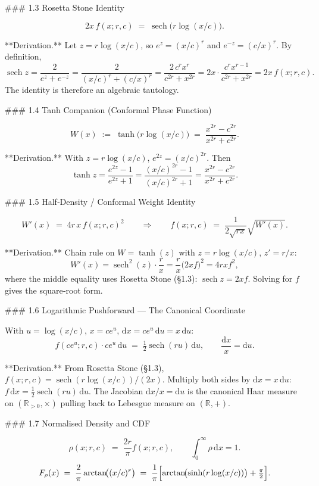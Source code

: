### 1.3 Rosetta Stone Identity

$$
\boxed{\;2x\,f(x;r,c)\;=\;\operatorname{sech}\!\bigl(r\log(x/c)\bigr).\;}
$$

**Derivation.** Let $z=r\log(x/c)$, so $e^{z}=(x/c)^{r}$ and $e^{-z}=(c/x)^{r}$. By definition,
$$
\operatorname{sech} z = \frac{2}{e^{z}+e^{-z}} = \frac{2}{(x/c)^{r}+(c/x)^{r}} = \frac{2\,c^{r}x^{r}}{c^{2r}+x^{2r}} = 2x\cdot\frac{c^{r}x^{r-1}}{c^{2r}+x^{2r}} = 2x\,f(x;r,c).
$$
The identity is therefore an algebraic tautology.

### 1.4 Tanh Companion (Conformal Phase Function)

$$
W(x)\;:=\;\tanh\!\bigl(r\log(x/c)\bigr)\;=\;\frac{x^{2r}-c^{2r}}{x^{2r}+c^{2r}}.
$$

**Derivation.** With $z = r\log(x/c)$, $e^{2z} = (x/c)^{2r}$. Then
$$
\tanh z = \frac{e^{2z}-1}{e^{2z}+1} = \frac{(x/c)^{2r}-1}{(x/c)^{2r}+1} = \frac{x^{2r}-c^{2r}}{x^{2r}+c^{2r}}.
$$

### 1.5 Half‑Density / Conformal Weight Identity

$$
W'(x)\;=\;4r\,x\,f(x;r,c)^{2}\qquad\Longrightarrow\qquad f(x;r,c)\;=\;\frac{1}{2\sqrt{r x}}\sqrt{W'(x)}.
$$

**Derivation.** Chain rule on $W = \tanh(z)$ with $z = r\log(x/c)$, $z' = r/x$:
$$
W'(x) = \operatorname{sech}^{2}(z)\cdot\frac{r}{x} = \frac{r}{x}\bigl(2xf\bigr)^{2} = 4rxf^{2},
$$
where the middle equality uses Rosetta Stone (§1.3): $\operatorname{sech} z = 2xf$. Solving for $f$ gives the square‑root form.

### 1.6 Logarithmic Pushforward — The Canonical Coordinate

With $u=\log(x/c)$, $x = ce^{u}$, $\mathrm dx = ce^{u}\,\mathrm du = x\,\mathrm du$:
$$
f(ce^{u};r,c)\cdot ce^{u}\,\mathrm du\;=\;\tfrac{1}{2}\operatorname{sech}(ru)\,\mathrm du,\qquad \frac{\mathrm dx}{x}=\mathrm du.
$$

**Derivation.** From Rosetta Stone (§1.3), $f(x;r,c) = \operatorname{sech}(r\log(x/c))/(2x)$. Multiply both sides by $\mathrm dx = x\,\mathrm du$: $f\,\mathrm dx = \tfrac{1}{2}\operatorname{sech}(ru)\,\mathrm du$. The Jacobian $\mathrm dx/x = \mathrm du$ is the canonical Haar measure on $(\mathbb R_{>0},\times)$ pulling back to Lebesgue measure on $(\mathbb R,+)$.

### 1.7 Normalised Density and CDF

$$
\rho(x;r,c)\;=\;\frac{2r}{\pi}f(x;r,c),\qquad \int_{0}^{\infty}\rho\,\mathrm dx=1.
$$
$$
F_{\rho}(x)\;=\;\frac{2}{\pi}\arctan\!\bigl((x/c)^{r}\bigr)\;=\;\frac{1}{\pi}\Bigl[\arctan\!\bigl(\sinh(r\log(x/c))\bigr)+\tfrac{\pi}{2}\Bigr].
$$


